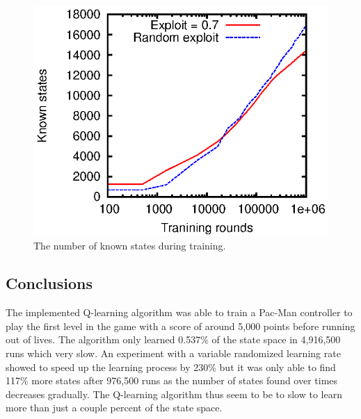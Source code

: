\documentclass[conference]{IEEEtran}
\begin{document}
\begin{figure}[!htb]
\centering
\includegraphics[scale=.7]{states-tl}
\caption{The number of known states during training.}
\label{fig:Qstates}
\end{figure}

\subsection{Conclusions}
The implemented Q-learning algorithm was able to train a Pac-Man controller to play the first level in the game with a score of around 5,000 points before running out of lives. The algorithm only learned 0.537\% of the state space in 4,916,500 runs which very slow. 
An experiment with a variable randomized learning rate showed to speed up the learning process by 230\% but it was only able to find 117\% more states after 976,500 runs as the number of states found over times decreases gradually. The Q-learning algorithm thus seem to be to slow to learn more than just a couple percent of the state space.
\end{document}
